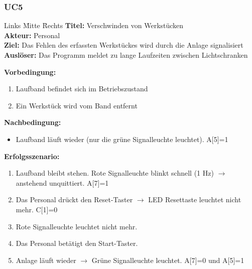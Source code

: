 \documentclass[oneside,a4paper,titlepage]{scrartcl} %
\begin{document}
\newpage

\subsubsection{UC5}
\begin{tabbing}
 Links \= Mitte \= Rechts \kill
 \textbf{Titel:} \> \> Verschwinden von Werkstücken\\
 \textbf{Akteur:} \> \> Personal\\
 \textbf{Ziel:} \> \> Das Fehlen des erfassten Werkstückes wird durch die Anlage signalisiert\\
 \textbf{Auslöser:} \> \> Das Programm meldet zu lange Laufzeiten zwischen Lichtschranken\\
\end{tabbing}
\textbf{Vorbedingung:}
\begin{enumerate}
 \item Laufband befindet sich im Betriebszustand
 \item Ein Werkstück wird vom Band entfernt
\end{enumerate}
\textbf{Nachbedingung:}
\begin{itemize}
 \item Laufband läuft wieder (nur die grüne Signalleuchte leuchtet). A[5]=1
\end{itemize}
\textbf{Erfolgsszenario:}
\begin{enumerate}
 \item Laufband bleibt stehen. Rote Signalleuchte blinkt schnell (1 Hz) $\rightarrow$ anstehend unquittiert. A[7]=1
 \item Das Personal drückt den Reset-Taster $\rightarrow$ LED Resettaste leuchtet nicht mehr. C[1]=0
 \item Rote Signalleuchte leuchtet nicht mehr.
 \item Das Personal betätigt den Start-Taster.
 \item Anlage läuft wieder $\rightarrow$ Grüne Signalleuchte leuchtet. A[7]=0 und A[5]=1
\end{enumerate}
\end{document}
